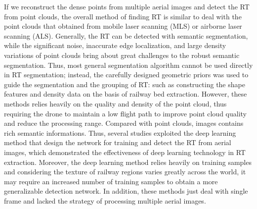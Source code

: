 If we reconstruct the dense points from multiple aerial images and detect the RT from point clouds,
the overall method of finding RT is similar to deal with the point clouds that obtained from mobile laser scanning (MLS) or airborne laser scanning (ALS).
Generally,
the RT can be detected with semantic segmentation,
while the significant noise, inaccurate edge localization, and large density variations of point clouds bring about great challenges to the robust semantic segmentation.
Thus,
most general segmentation algorithm cannot be used directly in RT segmentation;
instead,
the carefully designed geometric priors was used to guide the segmentation and the grouping of RT:
such as constructing the shape features and density data on the basis of railway bed extraction.
However,
these methods relies heavily on the quality and density of the point cloud,
thus requiring the drone to maintain a low flight path to improve point cloud quality and reduce the processing range.
Compared with point clouds,
images contains rich semantic informations.
Thus,
several studies exploited the deep learning method that design the network for training and detect the RT from aerial images,
which demonstrated the effectiveness of deep learning technology in RT extraction. 
Moreover,
the deep learning method relies heavily on training samples and considering the texture of railway regions varies greatly across the world,
it may require an increased number of training samples to obtain a more generalizable detection network.
In addition, 
these methods just deal with single frame and lacked the strategy of processing multiple aerial images.

